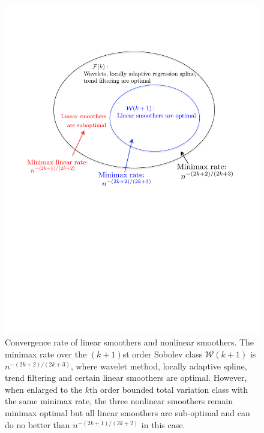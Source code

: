 \documentclass[a4paper]{article}
\renewcommand{\cal}{\mathcal}
\begin{document}
\begin{figure}[t!]
\centering
\includegraphics[width = 1\textwidth]{Figures/diagram.pdf}
\caption{Convergence rate of linear smoothers and nonlinear smoothers. The minimax rate over the $(k+1)$st order Sobolev class $\cal{W}(k+1)$ is $n^{-(2k+2)/(2k+3)}$, where wavelet method, locally adaptive spline, trend filtering and certain linear smoothers are optimal. However, when enlarged to the $k$th order bounded total variation class with the same minimax rate, the three nonlinear smoothers remain minimax optimal but all linear smoothers are sub-optimal and can do no better than $n^{-(2k+1)/(2k+2)}$ in this case.} 
\label{fig:diagram}
\end{figure}
 
\end{document}
